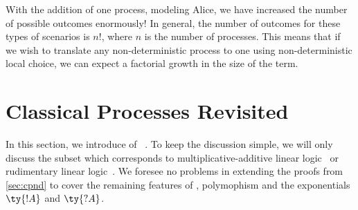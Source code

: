 \documentclass[UKenglish]{llncs}
\begin{document}
\begin{center}
\end{center}
With the addition of one process, modeling Alice, we have increased the number
of possible outcomes enormously! In general, the number of outcomes for these
types of scenarios is $n!$, where $n$ is the number of processes. This means
that if we wish to translate any non-deterministic process to one using
non-deterministic local choice, we can expect a factorial growth in the size of
the term.

\section{Classical Processes Revisited}\label{sec:cp-revisited}

In this section, we introduce of \cp~\cite{wadler2012,lindley2015semantics}.
To keep the discussion simple, we will only discuss the subset which corresponds
to multiplicative-additive linear logic~\cite[MALL]{girard1987} or rudimentary
linear logic~\cite[RLL]{girard1992}.
We foresee no problems in extending the proofs from \cref{sec:cpnd} to
cover the remaining features of \cp, polymophism and the exponentials $\ty{!A}$
and $\ty{?A}$. 
\end{document}
